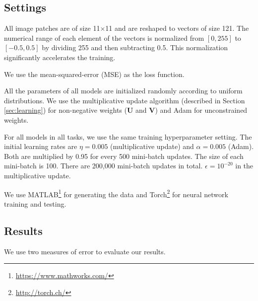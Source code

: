 \documentclass[conference]{IEEEtran}
\begin{document}
\subsection{Settings}

All image patches are of size 11$\times$11 and are reshaped to vectors of size 121. The numerical range of each element of the vectors is normalized from $[0, 255]$ to $[-0.5, 0.5]$ by dividing 255 and then subtracting 0.5. This normalization significantly accelerates the training.

We use the mean-squared-error (MSE) as the loss function.

All the parameters of all models are initialized randomly according to uniform distributions.
We use the multiplicative update algorithm (described in Section \ref{sec:learning}) for non-negative weights ($\mathbf{U}$ and $\mathbf{V}$) and Adam \cite{kingma2014adam} for unconstrained weights. 

For all models in all tasks, we use the same training hyperparameter setting. The initial learning rates are $\eta=0.005$ (multiplicative update) and  $\alpha=0.005$ (Adam). Both are multiplied by 0.95 for every 500 mini-batch updates. The size of each mini-batch is 100. There are 200,000 mini-batch updates in total. $\epsilon = 10^{-20}$ in the multiplicative update. 

We use MATLAB\footnote{\url{https://www.mathworks.com/}} for generating the data and Torch\footnote{\url{http://torch.ch/}} for neural network training and testing.




\subsection{Results}
We use two measures of error to evaluate our results.
\end{document}
